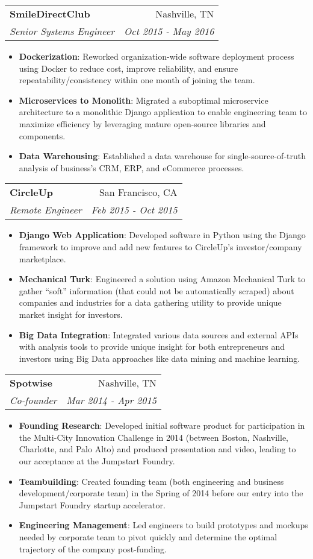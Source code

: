 \documentclass[letterpaper,10pt]{article}
\makeatletter
\newcommand{\resumeItem}[2]{
  \item\small{
    \textbf{#1}{: #2 \vspace{-2pt}}
  }
}
\newcommand{\resumeSubheading}[4]{
  \vspace{-1pt}\item
    \begin{tabular*}{0.97\textwidth}{l@{\extracolsep{\fill}}r}
      \textbf{#1} & #2 \\
      \textit{\small#3} & \textit{\small #4} \\
    \end{tabular*}\vspace{-5pt}
}
\newcommand{\resumeItemListStart}{\begin{itemize}}
\newcommand{\resumeItemListEnd}{\end{itemize}\vspace{-5pt}}
\makeatother
\begin{document}
    \resumeSubheading
      {SmileDirectClub}{Nashville, TN}
      {Senior Systems Engineer}{Oct 2015 - May 2016}
      \resumeItemListStart
        \resumeItem{Dockerization}
          {Reworked organization-wide software deployment process using Docker to reduce cost, improve reliability, and ensure repeatability/consistency within one month of joining the team.}
        \resumeItem{Microservices to Monolith}
          {Migrated a suboptimal microservice architecture to a monolithic Django application to enable engineering team to maximize efficiency by leveraging mature open-source libraries and components.}
        \resumeItem{Data Warehousing}
          {Established a data warehouse for single-source-of-truth analysis of business's CRM, ERP, and eCommerce processes.}
      \resumeItemListEnd
      
    \resumeSubheading
      {CircleUp}{San Francisco, CA}
      {Remote Engineer}{Feb 2015 - Oct 2015}
      \resumeItemListStart
        \resumeItem{Django Web Application}
          {Developed software in Python using the Django framework to improve and add new features to CircleUp’s investor/company marketplace.}
        \resumeItem{Mechanical Turk}
          {Engineered a solution using Amazon Mechanical Turk to gather “soft” information (that could not be automatically scraped) about companies and industries for a data gathering utility to provide unique market insight for investors.}
        \resumeItem{Big Data Integration}
          {Integrated various data sources and external APIs with analysis tools to provide unique insight for both entrepreneurs and investors using Big Data approaches like data mining and machine learning.}
      \resumeItemListEnd

    \resumeSubheading
      {Spotwise}{Nashville, TN}
      {Co-founder}{Mar 2014 - Apr 2015}
      \resumeItemListStart
        \resumeItem{Founding Research}
          {Developed initial software product for participation in the Multi-City Innovation Challenge in 2014 (between Boston, Nashville, Charlotte, and Palo Alto) and produced presentation and video, leading to our acceptance at the Jumpstart Foundry.}
        \resumeItem{Teambuilding}
          {Created founding team (both engineering and business development/corporate team) in the Spring of 2014 before our entry into the Jumpstart Foundry startup accelerator.}
        \resumeItem{Engineering Management}
          {Led engineers to build prototypes and mockups needed by corporate team to pivot quickly and determine the optimal trajectory of the company post-funding.}
      \resumeItemListEnd
\end{document}
